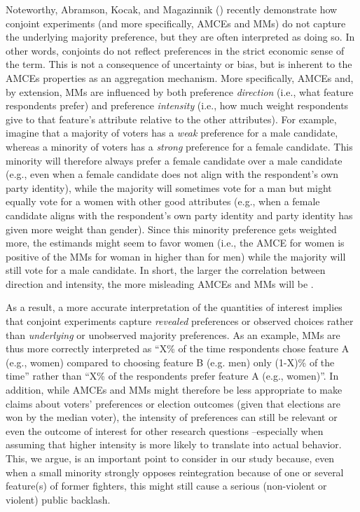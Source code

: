 Noteworthy, Abramson, Kocak, and Magazinnik (\citeyear{Abramson2019}) recently demonstrate how conjoint experiments (and more specifically, AMCEs and MMs) do not capture the underlying majority preference, but they are often interpreted as doing so. In other words, conjoints do not reflect preferences in the strict economic sense of the term. This is not a consequence of uncertainty or bias, but is inherent to the AMCEs properties as an aggregation mechanism. More specifically, AMCEs and, by extension, MMs are influenced by both preference \textit{direction} (i.e., what feature respondents prefer) and preference \textit{intensity} (i.e., how much weight respondents give to that feature's attribute relative to the other attributes). For example, imagine that a majority of voters has a \textit{weak} preference for a male candidate, whereas a minority of voters has a \textit{strong} preference for a female candidate. This minority will therefore always prefer a female candidate over a male candidate (e.g., even when a female candidate does not align with the respondent's own party identity), while the majority will sometimes vote for a man but might equally vote for a women with other good attributes (e.g., when a female candidate aligns with the respondent's own party identity and party identity has given more weight than gender). Since this minority preference gets weighted more, the estimands might seem to favor women (i.e., the AMCE for women is positive of the MMs for woman in higher than for men) while the majority will still vote for a male candidate. In short, the larger the correlation between direction and intensity, the more misleading AMCEs and MMs will be \citep{Abramson2019}. 

As a result, a more accurate interpretation of the quantities of interest implies that conjoint experiments capture \textit{revealed} preferences or observed choices rather than \textit{underlying} or unobserved majority preferences. As an example, MMs are thus more correctly interpreted as ``X\% of the time respondents chose feature A (e.g., women) compared to choosing feature B (e.g. men) only (1-X)\% of the time'' rather than ``X\% of the respondents prefer feature A (e.g., women)''. In addition, while AMCEs and MMs might therefore be less appropriate to make claims about voters' preferences or election outcomes (given that elections are won by the median voter), the intensity of preferences can still be relevant or even the outcome of interest for other research questions --especially when assuming that higher intensity is more likely to translate into actual behavior. This, we argue, is an important point to consider in our study because, even when a small minority strongly opposes reintegration because of one or several feature(s) of former fighters, this might still cause a serious (non-violent or violent) public backlash.


